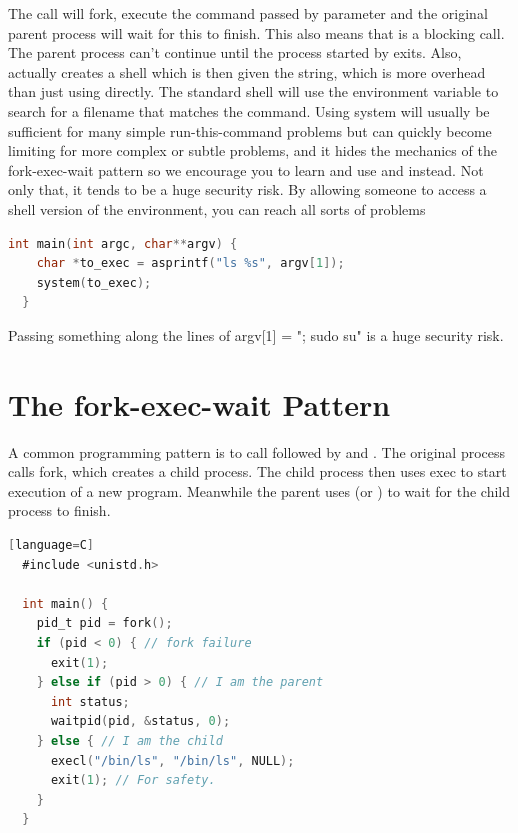 \begin{itemize}
\begin{itemize}
The  call will fork, execute the command passed by parameter and the original parent process will wait for this to finish.
This also means that  is a blocking call.
The parent process can't continue until the process started by  exits.
Also,  actually creates a shell which is then given the string, which is more overhead than just using  directly.
The standard shell will use the  environment variable to search for a filename that matches the command.
Using system will usually be sufficient for many simple run-this-command problems but can quickly become limiting for more complex or subtle problems, and it hides the mechanics of the fork-exec-wait pattern so we encourage you to learn and use   and  instead.
Not only that, it tends to be a huge security risk.
By allowing someone to access a shell version of the environment, you can reach all sorts of problems

\begin{lstlisting}[language=C]
  int main(int argc, char**argv) {
    char *to_exec = asprintf("ls %s", argv[1]);
    system(to_exec);
  }
\end{lstlisting}

Passing something along the lines of argv[1] = "; sudo su" is a huge security risk.

\section{The fork-exec-wait Pattern}

A common programming pattern is to call  followed by  and .
The original process calls fork, which creates a child process.
The child process then uses exec to start execution of a new program.
Meanwhile the parent uses  (or ) to wait for the child process to finish.

\begin{lstlisting}[language=C][language=C]
  #include <unistd.h>

  int main() {
    pid_t pid = fork();
    if (pid < 0) { // fork failure
      exit(1);
    } else if (pid > 0) { // I am the parent
      int status;
      waitpid(pid, &status, 0);
    } else { // I am the child
      execl("/bin/ls", "/bin/ls", NULL);
      exit(1); // For safety.
    }
  }
\end{lstlisting}


\end{itemize}
\end{itemize}
